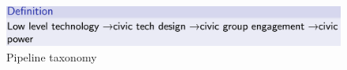 \begin{figure}[h]
	\centering
	\includegraphics[scale=0.3]{images/taxonomy-pipeline}
	\caption{Pipeline taxonomy}
	\label{fig:taxonomy-pipeline}
\end{figure}